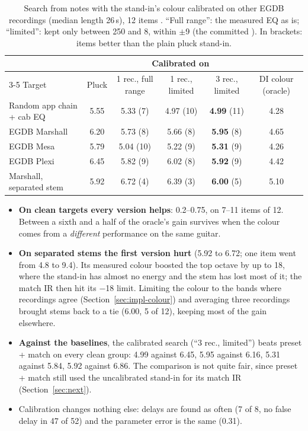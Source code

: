 \begin{table}[h]
\centering
\caption{Search from notes with the stand-in's colour calibrated on other EGDB
recordings (median length 26\,s), 12 items \measured. ``Full range'': the
measured EQ as is; ``limited'': kept only between 250\Hz{} and 8\kHz, within
$\pm$9\dB{} (the committed ). In brackets: items better than
the plain pluck stand-in.}
\label{tab:tone-calibration}
\footnotesize
\setlength{\tabcolsep}{4pt}
\begin{tabular}{@{}lccccc@{}}
\toprule
 & & \multicolumn{3}{c}{Calibrated on} & \\
\cmidrule(lr){3-5}
Target & Pluck & 1 rec., full range & 1 rec., limited & 3 rec., limited & DI colour (oracle) \\
\midrule
Random app chain + cab EQ & 5.55 & 5.33 (7) & 4.97 (10) & \textbf{4.99} (11) & 4.28 \\
EGDB Marshall & 6.20 & 5.73 (8) & 5.66 (8) & \textbf{5.95} (8) & 4.65 \\
EGDB Mesa & 5.79 & 5.04 (10) & 5.22 (9) & \textbf{5.31} (9) & 4.26 \\
EGDB Plexi & 6.45 & 5.82 (9) & 6.02 (8) & \textbf{5.92} (9) & 4.42 \\
Marshall, separated stem & 5.92 & 6.72 (4) & 6.39 (3) & \textbf{6.00} (5) & 5.10 \\
\bottomrule
\end{tabular}
\end{table}

\begin{itemize}
\item \textbf{On clean targets every version helps}: 0.2--0.75\dB, on 7--11
  items of 12. Between a sixth and a half of the oracle's gain survives when the colour comes
  from a \emph{different} performance on the same guitar.
\item \textbf{On separated stems the first version hurt} (5.92 to 6.72\dB; one
  item went from 4.8 to 9.4). Its measured colour boosted the top octave by up
  to 18\dB, where the stand-in has almost no energy and the stem has lost most
  of it; the match IR then hit its $-$18\dB{} limit. Limiting the colour to the
  bands where recordings agree (Section~\ref{sec:impl-colour}) and averaging
  three recordings brought stems back to a tie (6.00\dB, 5 of 12), keeping most
  of the gain elsewhere.
\item \textbf{Against the baselines}, the calibrated search (``3 rec., limited'')
  beats preset + match on every clean group: 4.99 against 6.45, 5.95 against
  6.16, 5.31 against 5.84, 5.92 against 6.86\dB. The comparison is not quite
  fair, since preset + match still used the uncalibrated stand-in for its match
  IR (Section~\ref{sec:next}).
\item Calibration changes nothing else: delays are found as often (7 of 8, no
  false delay in 47 of 52) and the parameter error is the same (0.31).
\end{itemize}

